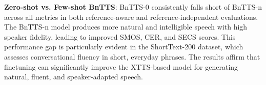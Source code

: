 \begin{table}[ht!]
\centering
{}
\caption{Impact of prompt duration, temperature (T), and Top-K on BnTTS-n performance in the Short-BnStudioEval Dataset.}
\label{tab:eval_on_short_Studio_eval}
\vspace{-0.3cm}
\end{table}


\noindent \textbf{Zero-shot vs. Few-shot BnTTS}: BnTTS-0 consistently falls short of BnTTS-n across all metrics in both reference-aware and reference-independent evaluations. The BnTTS-n model produces more natural and intelligible speech with high speaker fidelity, leading to improved SMOS, CER, and SECS scores. This performance gap is particularly evident in the ShortText-200 dataset, which assesses conversational fluency in short, everyday phrases. The results affirm that finetuning can significantly improve the XTTS-based model for generating natural, fluent, and speaker-adapted speech.

